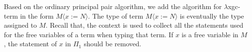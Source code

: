 Based on the ordinary principal pair algorithm, we add the algorithm for $\lambda$xgc-term in the form $M\langle x:=N\rangle$. The type of term $M\langle x:=N\rangle$ is eventually the type assigned to $M$. Recall that, the context is used to collect all the statements used for the free variables of a term when typing that term. If $x$ is a free variable in $M$, the statement of $x$ in $\Pi_1$ should be removed.




















  

